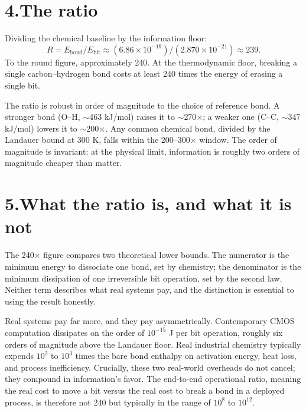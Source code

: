 \documentclass[11pt]{article}
\begin{document}
\section*{4.\quad The ratio}
Dividing the chemical baseline by the information floor:
\[
R = E_{\text{bond}} / E_{\text{bit}} \approx (6.86 \times 10^{-19}) / (2.870 \times 10^{-21}) \approx 239.
\]
To the round figure, approximately 240. At the thermodynamic floor, breaking a single carbon--hydrogen bond costs at least 240 times the energy of erasing a single bit.

The ratio is robust in order of magnitude to the choice of reference bond. A stronger bond (O--H, $\sim$463 kJ/mol) raises it to $\sim$270$\times$; a weaker one (C--C, $\sim$347 kJ/mol) lowers it to $\sim$200$\times$. Any common chemical bond, divided by the Landauer bound at 300 K, falls within the 200--300$\times$ window. The order of magnitude is invariant: at the physical limit, information is roughly two orders of magnitude cheaper than matter.

\section*{5.\quad What the ratio is, and what it is not}
The 240$\times$ figure compares two theoretical lower bounds. The numerator is the minimum energy to dissociate one bond, set by chemistry; the denominator is the minimum dissipation of one irreversible bit operation, set by the second law. Neither term describes what real systems pay, and the distinction is essential to using the result honestly.

Real systems pay far more, and they pay asymmetrically. Contemporary CMOS computation dissipates on the order of $10^{-15}$ J per bit operation, roughly six orders of magnitude above the Landauer floor. Real industrial chemistry typically expends $10^{2}$ to $10^{3}$ times the bare bond enthalpy on activation energy, heat loss, and process inefficiency. Crucially, these two real-world overheads do not cancel; they compound in information's favor. The end-to-end operational ratio, meaning the real cost to move a bit versus the real cost to break a bond in a deployed process, is therefore not 240 but typically in the range of $10^{8}$ to $10^{12}$.
\end{document}
